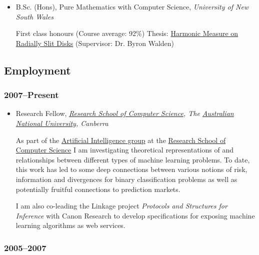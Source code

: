 \documentclass{article}
\begin{document}
\begin{itemize}%
\item B.Sc. (Hons), Pure Mathematics with Computer Science, \emph{University of New South Wales}

First class honours (Course average: 92\%) \newline Thesis: \href{http//mark.reid.name/files/pubs/unsw96.pdf}{Harmonic Measure on Radially Slit Disks} (Supervisor: Dr. Byron Walden)



\end{itemize}
\hypertarget{employment}{}\subsection*{{Employment}}\label{employment}

\hypertarget{2007present}{}\subsubsection*{{2007--{}Present}}\label{2007present}

\begin{itemize}%
\item Research Fellow, \emph{\href{http://cs.anu.edu.au/}{Research School of Computer Science}, The \href{http://anu.edu.au/}{Australian National University}, Canberra}

As part of the \href{http://ai.cecs.anu.edu.au/}{Artificial Intelligence group} at the \href{http://cs.anu.edu.au/}{Research School of Computer Science} I am investigating theoretical representations of and relationships between different types of machine learning problems. To date, this work has led to some deep connections between various notions of risk, information and divergences for binary classification problems as well as potentially fruitful connections to prediction markets.

I am also co-leading the Linkage project \emph{Protocols and Structures for Inference} with Canon Research to develop specifications for exposing machine learning algorithms as web services.



\end{itemize}
\hypertarget{20052007}{}\subsubsection*{{2005--{}2007}}\label{20052007}
\end{document}
